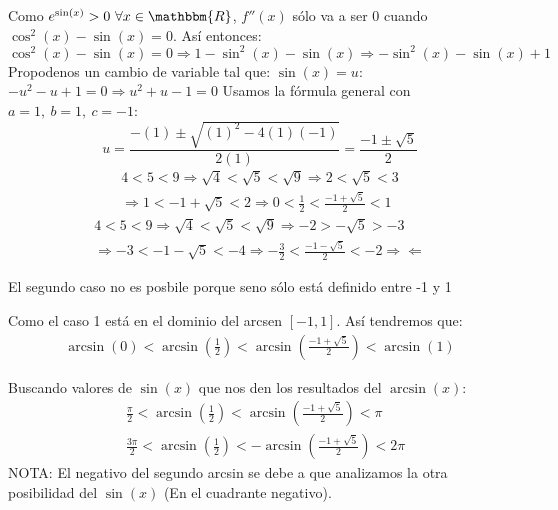 \documentclass[12pt]{article}
\begin{document}
\begin{enumerate}[\hspace{9px} a)]
            Como \(e^{\sin(x)}>0 \ \forall x\in\mathbbm{R}\), \(f''(x)\) s\'olo va a ser 0 cuando \(\cos^2(x)-\sin(x)=0\). As\'i entonces:
            \begin{equation*}
                \cos^2(x)-\sin(x)=0 \Longrightarrow 1-\sin^2(x)-\sin(x) \Longrightarrow -\sin^2(x)-\sin(x)+1
            \end{equation*}
            Propodenos un cambio de variable tal que: \(\sin(x)=u\): \quad \(-u^2-u+1=0 \Longrightarrow u^2+u-1=0\)\medskip
            Usamos la f\'ormula general con \(a=1, \ b=1, \ c=-1\):
            \begin{equation*}
                u = \frac{-(1)\pm\sqrt{(1)^2-4(1)(-1)}}{2(1)} = \frac{-1\pm\sqrt{5}}{2} 
            \end{equation*}
            \begin{multline*}
                4<5<9 \Longrightarrow \sqrt{4}<\sqrt{5}<\sqrt{9} \Longrightarrow 2<\sqrt{5}<3 \\ \Longrightarrow 1<-1+\sqrt{5}<2 \Longrightarrow 0<\frac{1}{2}<\frac{-1+\sqrt{5}}{2}<1
            \end{multline*}
            \begin{multline*}
                4<5<9 \Longrightarrow \sqrt{4}<\sqrt{5}<\sqrt{9} \Longrightarrow -2>-\sqrt{5}>-3 \\ \Longrightarrow -3<-1-\sqrt{5}<-4 \Longrightarrow -\frac{3}{2}<\frac{-1-\sqrt{5}}{2}<-2 \Rightarrow\!\Leftarrow
            \end{multline*}

            El segundo caso no es posbile porque seno s\'olo est\'a definido entre -1 y 1\medskip

            Como el caso 1 est\'a en el dominio del arcsen \([-1,1]\). As\'i tendremos que:
            \begin{align*}
                \arcsin(0)<\arcsin\left(\frac{1}{2}\right)<\arcsin\left(\frac{-1+\sqrt{5}}{2}\right)<\arcsin(1)
            \end{align*}

            Buscando valores de \(\sin(x)\) que nos den los resultados del \(\arcsin(x)\):
            \begin{align*}
                &\frac{\pi}{2}<\arcsin\left(\frac{1}{2}\right)<\arcsin\left(\frac{-1+\sqrt{5}}{2}\right)<\pi\\
                &\frac{3\pi}{2}<\arcsin\left(\frac{1}{2}\right)<-\arcsin\left(\frac{-1+\sqrt{5}}{2}\right)<2\pi
            \end{align*}
            NOTA: El negativo del segundo arcsin se debe a que analizamos la otra posibilidad del \(\sin(x)\) (En el cuadrante negativo).\medskip


\end{enumerate}
\end{document}
